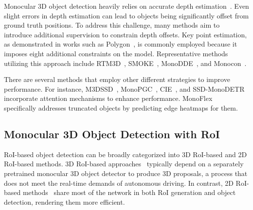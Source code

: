 \documentclass[journal]{IEEEtran}
\begin{document}
	Monocular 3D object detection heavily relies on accurate depth estimation~\cite{monodle}. Even slight errors in depth estimation can lead to objects being significantly offset from ground truth positions. To address this challenge, many methods aim to introduce additional supervision to constrain depth offsets. Key point estimation, as demonstrated in works such as Polygon~\cite{polygon}, is commonly employed because it imposes eight additional constraints on the model. Representative methods utilizing this approach include RTM3D~\cite{rtm3d}, SMOKE~\cite{smoke}, MonoDDE~\cite{monodde}, and Monocon~\cite{monocon}.
	
	There are several methods that employ other different strategies to improve performance. For instance, M3DSSD~\cite{m3dssd}, MonoPGC~\cite{monopgc}, CIE~\cite{cie}, and SSD-MonoDETR~\cite{ssd-monodetr} incorporate attention mechanisms to enhance performance. MonoFlex~\cite{monoflex} specifically addresses truncated objects by predicting edge heatmaps for them.
	
	\subsection{Monocular 3D Object Detection with RoI}
	
	RoI-based object detection can be broadly categorized into 3D RoI-based and 2D RoI-based methods. 3D RoI-based approaches~\cite{neurocs, monoxiver} typically depend on a separately pretrained monocular 3D object detector to produce 3D proposals, a process that does not meet the real-time demands of autonomous driving. In contrast, 2D RoI-based methods~\cite{roi10d, didm3d, gupnet, gupnet++} share most of the network in both RoI generation and object detection, rendering them more efficient.
	
\end{document}
